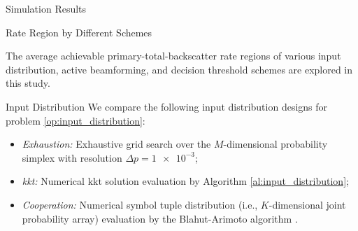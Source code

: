 \documentclass[journal]{IEEEtran}
\begin{document}
\begin{section}{Simulation Results}
	\begin{subsection}{Rate Region by Different Schemes}
		\begin{figure*}[!t]
			\centering
			\caption{
				Average primary-total-backscatter rate regions for different input distribution, active beamforming, and decision threshold schemes.
				``BSP'' means backscatter symbol period.
			}
		\end{figure*}
		The average achievable primary-total-backscatter rate regions of various input distribution, active beamforming, and decision threshold schemes are explored in this study.

		\begin{subsubsection}{Input Distribution}
			We compare the following input distribution designs for problem \eqref{op:input_distribution}:
			\begin{itemize}
				\item \emph{Exhaustion:} Exhaustive grid search over the $M$-dimensional probability simplex with resolution $\Delta p = \num{1e-3}$;
				\item \emph{\gls{kkt}:} Numerical \gls{kkt} solution evaluation by Algorithm \ref{al:input_distribution};
				\item \emph{Cooperation:} Numerical symbol tuple distribution (i.e., $K$-dimensional joint probability array) evaluation by the Blahut-Arimoto algorithm \cite{Arimoto1972,Blahut1972a}.
			\end{itemize}


\end{subsubsection}
\end{subsection}
\end{section}
\end{document}
